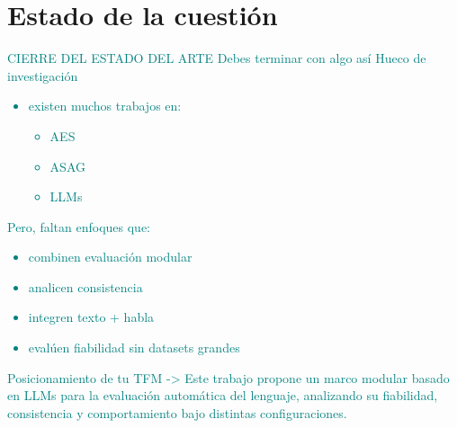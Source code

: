 \chapter{Estado de la cuestión} \label{chap-2-Estado-cuestion}





\textcolor{teal}{
    CIERRE DEL ESTADO DEL ARTE
    Debes terminar con algo así 
    Hueco de investigación
    \begin{itemize}
        \item existen muchos trabajos en:
        \begin{itemize}
            \item AES
            \item ASAG
            \item LLMs
        \end{itemize}
    \end{itemize}    
    Pero, faltan enfoques que:
    \begin{itemize}
        \item combinen evaluación modular
        \item analicen consistencia
        \item integren texto + habla
        \item evalúen fiabilidad sin datasets grandes
    \end{itemize}
    Posicionamiento de tu TFM -> Este trabajo propone un marco modular basado en LLMs para la evaluación automática del lenguaje, analizando su fiabilidad, consistencia y comportamiento bajo distintas configuraciones.
}